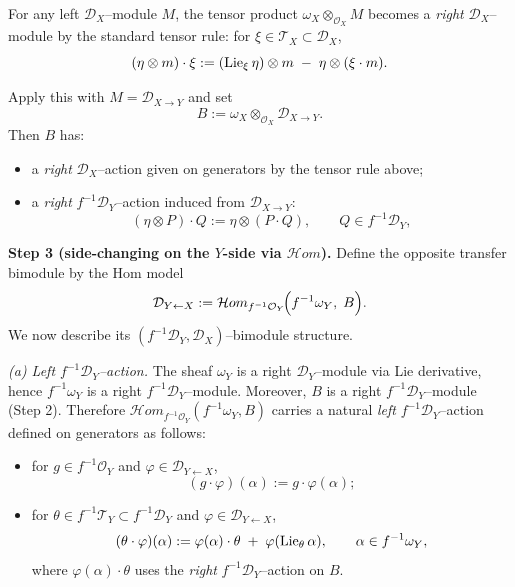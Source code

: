 \begin{example}
    For any left $\mathcal D_X$--module $M$, the tensor product
    $\omega_X\otimes_{\mathcal O_X}M$ becomes a \emph{right}
    $\mathcal D_X$--module by the standard tensor rule:
    for $\xi\in\mathcal{T}_X\subset \mathcal D_X$,
    \[
        (\eta\otimes m)\cdot \xi
        := (\operatorname{Lie}_\xi \eta)\otimes m \;-\; \eta\otimes(\xi\cdot m).
    \]

    Apply this with $M=\mathcal D_{X\to Y}$ and set
    \[
        B := \omega_X\otimes_{\mathcal O_X}\mathcal D_{X\to Y}.
    \]
    Then $B$ has:
    \begin{itemize}
        \item a \emph{right} $\mathcal D_X$--action given on generators by the tensor rule above;
        \item a \emph{right} $f^{-1}\mathcal D_Y$--action induced from $\mathcal D_{X\to Y}$:
              \[
                  (\eta\otimes P)\cdot Q := \eta\otimes(P\cdot Q),
                  \qquad Q\in f^{-1}\mathcal D_Y,
              \]
    \end{itemize}

    \medskip
    \noindent\textbf{Step 3 (side-changing on the $Y$-side via $\mathcal Hom$).}
    Define the opposite transfer bimodule by the Hom model \cite[Definition~8.6.4]{SabbahSchnell_MHMChap8_TrainingDModules}
    \[
        \mathcal D_{Y\leftarrow X}
        :=\mathcal Hom_{f^{-1}\mathcal O_Y}\!\Bigl(f^{-1}\omega_Y,\; B\Bigr).
    \]
    We now describe its $(f^{-1}\mathcal D_Y,\mathcal D_X)$--bimodule structure.

    \smallskip
    \emph{(a) Left $f^{-1}\mathcal D_Y$--action.}
    The sheaf $\omega_Y$ is a right $\mathcal D_Y$--module via Lie derivative, hence
    $f^{-1}\omega_Y$ is a right $f^{-1}\mathcal D_Y$--module.
    Moreover, $B$ is a right $f^{-1}\mathcal D_Y$--module (Step 2).
    Therefore $\mathcal Hom_{f^{-1}\mathcal O_Y}(f^{-1}\omega_Y,B)$ carries a natural
    \emph{left} $f^{-1}\mathcal D_Y$--action defined on generators as follows:

    \begin{itemize}
        \item for $g\in f^{-1}\mathcal O_Y$ and $\varphi\in \mathcal D_{Y\leftarrow X}$,
              \[
                  (g\cdot \varphi)(\alpha) := g\cdot \varphi(\alpha);
              \]
        \item for $\theta\in f^{-1}\mathcal{T}_Y\subset f^{-1}\mathcal D_Y$ and $\varphi\in \mathcal D_{Y\leftarrow X}$,
              \[
                  (\theta\cdot \varphi)(\alpha)
                  := \varphi(\alpha)\cdot \theta \;+\; \varphi(\operatorname{Lie}_\theta \alpha),
                  \qquad \alpha\in f^{-1}\omega_Y,
              \]
              where $\varphi(\alpha)\cdot\theta$ uses the \emph{right} $f^{-1}\mathcal D_Y$--action on $B$.
    \end{itemize}


\end{example}
